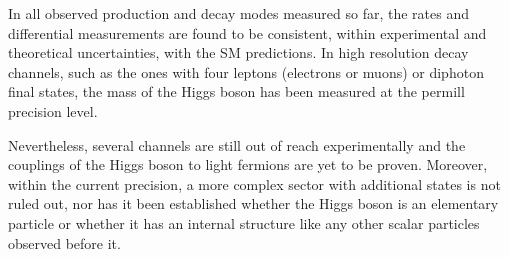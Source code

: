 \documentclass[12pt]{article}
\begin{document}
In all observed production and decay modes measured so far, the rates and differential measurements are found to be consistent, within experimental and theoretical uncertainties, with the SM predictions. In high resolution decay channels, such as the ones with four leptons (electrons or muons) or diphoton final states, the mass of the Higgs boson has been measured at the permill precision level.

Nevertheless, several channels are still out of reach experimentally and the couplings of the Higgs boson to light fermions are yet to be proven. Moreover, within the current precision, a more complex sector with additional states is not ruled out, nor has it been established whether the Higgs boson is an elementary particle or whether it has an internal structure like any other scalar particles observed before it.
\end{document}
